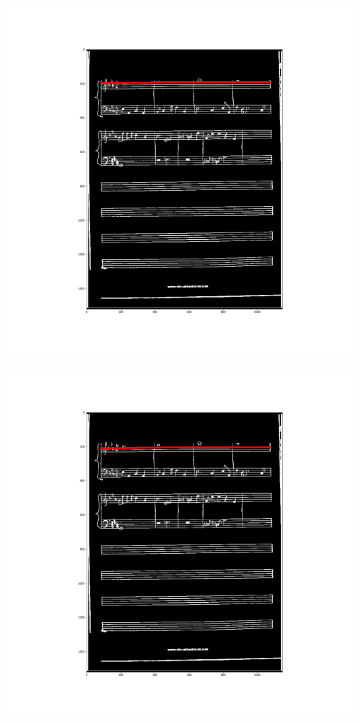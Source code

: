 \documentclass[12pt]{article}
\begin{document}
\begin{figure}[h!]
\begin{subfigure}[b]{0.32\linewidth}
		\end{subfigure}
		\begin{subfigure}[b]{0.32\linewidth}
			\includegraphics[width=\linewidth]{zdj/BFS2.png}
		\end{subfigure}
		\begin{subfigure}[b]{0.32\linewidth}
			\includegraphics[width=\linewidth]{zdj/BFS3.png}

\end{subfigure}
\end{figure}
\end{document}
